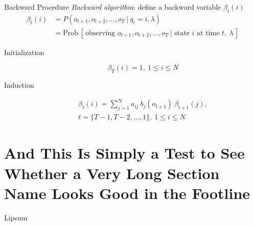\documentclass[10pt]{beamer}
\begin{document}
\begin{frame}{Backward Procedure}
  \textit{Backward algorithm}: define a backward variable $\beta_t(i)$
  \begin{align}
    \beta_t(i)
     & = P(o_{t+1}, o_{t+2}, \dots, o_T\ |\ q_t = i, \lambda)                                                               \\
     & = \text{Prob}\,[\,\text{observing } o_{t+1}, o_{t+2}, \dots, o_T\ | \text{ state } i \text{ at time } t,\ \lambda\,]
  \end{align}

  \begin{description}
    \item[Initialization]
          \begin{equation}
            \beta_T(i) = 1,\ 1 \leq i \leq N
          \end{equation}
    \item[Induction]
          \begin{multline}
            \beta_{t}(i) = \sum_{j=1}^{N} a_{i j}\ b_j (o_{t+1})\  \beta_{t+1}(j),\\
            t = \{ T-1, T-2, \dots, 1\},\ 1 \leq i \leq N
          \end{multline}
  \end{description}
\end{frame}

\section{And This Is Simply a Test to See Whether a Very Long Section Name Looks Good in the Footline}

\begin{frame}{Lipsum}
  \begin{quotation}
    \lipsum[1]
  \end{quotation}
\end{frame}
\end{document}
